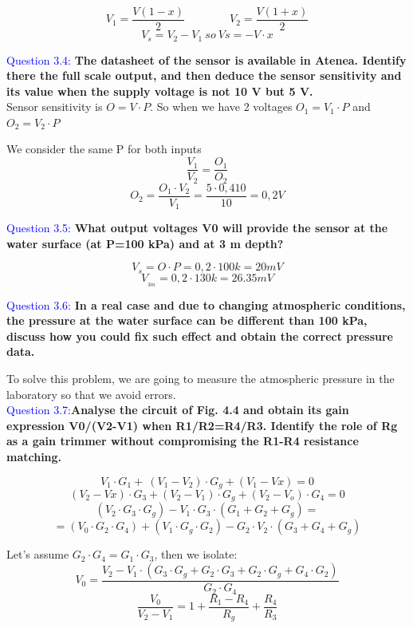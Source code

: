 \documentclass[12pt, a4papre]{article}
\begin{document}
	\[
	V_{1} =\frac{V( 1-x)}{2}
	\qquad \qquad
	V_{2} =\frac{V( 1+x)}{2}
	\]\[
	V_{s} =V_{2} -V_{1} \ so\ Vs=-V\cdotp x
	\]
	
	\textcolor{blue}{Question 3.4:} \textbf{The datasheet of the sensor is available in Atenea. Identify there the full scale output, and then deduce the sensor sensitivity and its value when the supply voltage is not 10 V but 5 V.}\\
	
	Sensor sensitivity is $O=V\cdotp P$. So when we have 2 voltages $O_{1} =V_{1}\cdot P$ and $O_{2} =V_{2} \cdot P$

	We consider the same P for both inputs \\
	\[\frac{V_{1}}{V_{2}} =\frac{O_{1}}{O_{2}}\]
	\[O_{2} =\frac{O_{1} \cdotp V_{2}}{V_{1}} =\frac{5\cdotp 0,410}{10} =0,2V\]

	\textcolor{blue}{Question 3.5:} \textbf{What output voltages V0 will provide the sensor at the water surface (at P=100 kPa) and at 3 m depth? }

	\[V_{s} =O\cdotp P=0,2\cdotp 100k= 20mV\]
	\[V_{_{3m}} =0,2\cdotp 130k=26.35mV\]
	
	
	\textcolor{blue}{Question 3.6:} \textbf{ In a real case and due to changing atmospheric conditions, the pressure at the water surface can be different than 100 kPa, discuss how you could fix such effect and obtain the correct pressure data.} 
	
	To solve this problem, we are going to measure the atmospheric pressure in the laboratory so that we avoid errors.\\
	
	\textcolor{blue}{Question 3.7:}\textbf{Analyse the circuit of Fig. 4.4 and obtain its gain expression V0/(V2-V1) when R1/R2=R4/R3.  Identify the role of Rg as a gain trimmer without compromising the R1-R4 resistance matching.}
	
	\[V_{1} \cdotp G_{1} +\ ( V_{1} -V_{2}) \cdotp G_{g} +( V_{1} -Vx) =0\]
	\[( V_{2} -Vx) \cdotp G_{3} +( V_{2} -V_{1}) \cdotp G_{g} +( V_{2} -V_{o}) \cdotp G_{4} =0\]
	\[( V_{2} \cdotp G_{3} \cdotp G_{g}) -V_{1} \cdotp G_{3} \cdotp ( G_{1} +G_{2} +G_{g}) =\]
	\[=( V_{0} \cdotp G_{2} \cdotp G_{4}) +( V_{1} \cdotp G_{g} \cdotp G_{2}) -G_{2} \cdotp V_{2} \cdotp ( G_{3} +G_{4} +G_{g})\]
	
	Let's assume $G_{2} \cdotp G_{4} =G_{1} \cdotp G_{3}$, then we isolate:
	\[V_{0}  = \frac{V_{2} -V_{1} \cdotp ( G_{3} \cdotp G_{g} +G_{2} \cdotp G_{3} +G_{2} \cdotp G_{g} +G_{4} \cdotp G_{2})}{G_{2} \cdotp G_{4}}\]
	\[\frac{V_{0}}{V_{2} -V_{1}} =1+\frac{R_{1} -R_{4}}{R_{g}} +\frac{R_{4}}{R_{3}}\]
	\\
	
\end{document}
